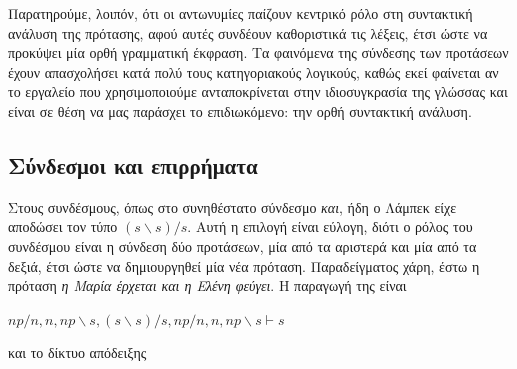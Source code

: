 \documentclass [a4paper,11pt] {book}
\theoremstyle{definition}
\theoremstyle{definition}
\begin{document}
Παρατηρούμε, λοιπόν, ότι οι αντωνυμίες παίζουν κεντρικό ρόλο στη συντακτική ανάλυση της πρότασης, αφού αυτές συνδέουν καθοριστικά τις λέξεις, έτσι ώστε να προκύψει μία ορθή γραμματική έκφραση. Τα φαινόμενα της σύνδεσης των προτάσεων έχουν απασχολήσει κατά πολύ τους κατηγοριακούς λογικούς, καθώς εκεί φαίνεται αν το εργαλείο που χρησιμοποιούμε ανταποκρίνεται στην ιδιοσυγκρασία της γλώσσας και είναι σε θέση να μας παράσχει το επιδιωκόμενο: την ορθή συντακτική ανάλυση.
\subsection{Σύνδεσμοι και επιρρήματα}
Στους συνδέσμους, όπως στο συνηθέστατο σύνδεσμο \textit{και}, ήδη ο Λάμπεκ \citep{lamb:math58} είχε αποδώσει τον τύπο $(s\backslash s)/s$. Αυτή η επιλογή είναι εύλογη, διότι ο ρόλος του συνδέσμου είναι η σύνδεση δύο προτάσεων, μία από τα αριστερά και μία από τα δεξιά, έτσι ώστε να δημιουργηθεί μία νέα πρόταση. Παραδείγματος χάρη, έστω η πρόταση \textit{η Μαρία έρχεται και η Ελένη φεύγει}. Η παραγωγή της είναι
\begin{center}
$np/n,n,np\backslash s,(s\backslash s)/s,np/n,n,np\backslash s\vdash s$
\end{center}
και το δίκτυο απόδειξης
\begin{center}
\end{center}
\end{document}
